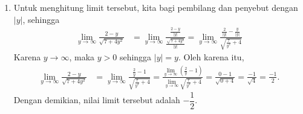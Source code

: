 \documentclass[11pt,openany,a4paper]{article}
\begin{document}
\begin{enumerate}
\begin{enumerate}
\begin{center}
                    \end{center}
          \end{enumerate}
    \item  Untuk menghitung limit tersebut, kita bagi pembilang dan penyebut dengan $|y|$, sehingga
          \begin{align*}
              \lim_{y \to \infty} \frac{2 - y}{\sqrt{7 + 4y^2}} & = \lim_{y \to \infty} \frac{\frac{2 - y}{|y|}}{\frac{\sqrt{7 + 4y^2}}{|y|}}    = \lim_{y \to \infty} \frac{\frac{2}{|y|} - \frac{y}{|y|}}{\sqrt{\frac{7}{y^2} + 4}}
          \end{align*}
          Karena $y \to \infty$, maka $y > 0$ sehingga $|y| = y$. Oleh karena itu,
          \begin{align*}
              \lim_{y \to \infty} \frac{2 - y}{\sqrt{7 + 4y^2}} & = \lim_{y \to \infty} \frac{\frac{2}{y} - 1}{\sqrt{\frac{7}{y^2} + 4}}                                                                 = \frac{\lim_{y \to \infty} \left(\frac{2}{y} - 1\right)}{\lim_{y \to \infty} \sqrt{\frac{7}{y^2} + 4}}                                                                                 = \frac{0 - 1}{\sqrt{0 + 4}}                                                                                                     = \frac{-1}{\sqrt{4}}                                                                                                     = \frac{-1}{2}.
          \end{align*}
          Dengan demikian, nilai limit tersebut adalah $-\dfrac{1}{2}$.


\end{enumerate}
\end{document}
